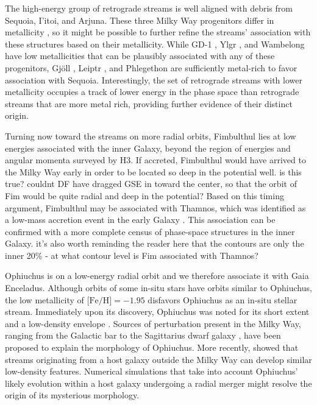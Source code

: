 \documentclass[twocolumn]{aastex63}
\newcommand{\feh}{\ensuremath{\textrm{[Fe/H]}}}
\begin{document}
The high-energy group of retrograde streams is well aligned with debris from Sequoia, I'itoi, and Arjuna.
These three Milky Way progenitors differ in metallicity \citep{naidu2020}, so it might be possible to further refine the streams' association with these structures based on their metallicity.
While GD-1 \citep[spectroscopic $\feh=-2.3$,][]{bonaca2020b}, Ylgr \citep[spectroscopic $\feh=-1.9$,][]{ibata2019}, and  Wambelong \citep[isochrone $\feh=-2.2$,][]{shipp2018} have low metallicities that can be plausibly associated with any of these progenitors, Gj\" oll \citep[spectroscopic $\feh=-1.5$,][]{hansen2020}, Leiptr \citep[isochrone $\feh=-1.6$,][]{ibata2019}, and Phlegethon \citep[spectroscopic $\feh=-1.6$,][]{ibata2018} are sufficiently metal-rich to favor association with Sequoia.
Interestingly, the set of retrograde streams with lower metallicity occupies a track of lower energy in the phase space than retrograde streams that are more metal rich, providing further evidence of their distinct origin.

Turning now toward the streams on more radial orbits, Fimbulthul lies at low energies associated with the inner Galaxy, beyond the region of energies and angular momenta surveyed by H3.
If accreted, Fimbulthul would have arrived to the Milky Way early in order to be located so deep in the potential well. {\color{red} is this true?  couldnt DF have dragged GSE in toward the center, so that the orbit of Fim would be quite radial and deep in the potential?}
Based on this timing argument, Fimbulthul may be associated with Thamnos, which was identified as a low-mass accretion event in the early Galaxy \citep{koppelman2019}.
This association can be confirmed with a more complete census of phase-space structures in the inner Galaxy.  {\color{red} it's also worth reminding the reader here that the contours are only the inner 20\% - at what contour level is Fim associated with Thamnos?}

Ophiuchus is on a low-energy radial orbit and we therefore associate it with Gaia Enceladus.
Although orbits of some in-situ stars have orbits similar to Ophiuchus, the low metallicity of $\feh=-1.95$ \citep{sesar2015} disfavors Ophiuchus as an in-situ stellar stream.
Immediately upon its discovery, Ophiuchus was noted for its short extent and a low-density envelope \citep{bernard2015, sesar2015}.
Sources of perturbation present in the Milky Way, ranging from the Galactic bar \citep{price-whelan2016} to the Sagittarius dwarf galaxy \citep{lane2020}, have been proposed to explain the morphology of Ophiuchus.
More recently, \citet{carlberg2019} showed that streams originating from a host galaxy outside the Milky Way can develop similar low-density features.
Numerical simulations that take into account Ophiuchus' likely evolution within a host galaxy undergoing a radial merger might resolve the origin of its mysterious morphology.
\end{document}
